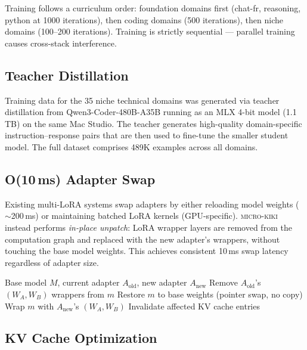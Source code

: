 \documentclass[11pt,a4paper]{article}
\begin{document}
Training follows a curriculum order: foundation domains first (chat-fr, reasoning, python at 1000 iterations), then coding domains (500 iterations), then niche domains (100--200 iterations). Training is strictly sequential --- parallel training causes cross-stack interference.

\subsection{Teacher Distillation}

Training data for the 35 niche technical domains was generated via teacher distillation from Qwen3-Coder-480B-A35B running as an MLX 4-bit model (1.1\,TB) on the same Mac Studio. The teacher generates high-quality domain-specific instruction--response pairs that are then used to fine-tune the smaller student model. The full dataset comprises 489K examples across all domains.

\subsection{O(10\,ms) Adapter Swap}

Existing multi-LoRA systems swap adapters by either reloading model weights ($\sim$200\,ms) or maintaining batched LoRA kernels (GPU-specific). \textsc{micro-kiki} instead performs \emph{in-place unpatch}: LoRA wrapper layers are removed from the computation graph and replaced with the new adapter's wrappers, without touching the base model weights. This achieves consistent 10\,ms swap latency regardless of adapter size.

\begin{algorithm}[h]
\caption{In-place LoRA unpatch and swap}
\label{alg:swap}
\begin{algorithmic}
\REQUIRE Base model $M$, current adapter $A_\text{old}$, new adapter $A_\text{new}$
  \STATE Remove $A_\text{old}$'s $(W_A, W_B)$ wrappers from $m$
  \STATE Restore $m$ to base weights (pointer swap, no copy)
\ENDFOR
{}
  \STATE Wrap $m$ with $A_\text{new}$'s $(W_A, W_B)$
\ENDFOR
\STATE Invalidate affected KV cache entries
\end{algorithmic}
\end{algorithm}

\subsection{KV Cache Optimization}
\end{document}
